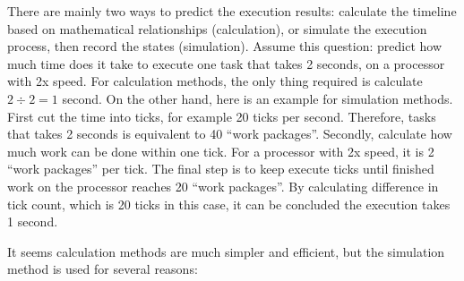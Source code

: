 \documentclass[msc,deptreport, cs]{infthesis}
\begin{document}
There are mainly two ways to predict the execution results: calculate the timeline based on mathematical relationships (calculation), or simulate the execution process, then record the states (simulation). Assume this question: predict how much time does it take to execute one task that takes 2 seconds, on a processor with 2x speed. For calculation methods, the only thing required is calculate $2\div 2 = 1$ second. On the other hand, here is an example for simulation methods. First cut the time into ticks, for example 20 ticks per second. Therefore, tasks that takes 2 seconds is equivalent to 40 ``work packages''. Secondly, calculate how much work can be done within one tick. For a processor with 2x speed, it is 2 ``work packages'' per tick. The final step is to keep execute ticks until finished work on the processor reaches 20 ``work packages''. By calculating difference in tick count, which is 20 ticks in this case, it can be concluded the execution takes 1 second.

It seems calculation methods are much simpler and efficient, but the simulation method is used for several reasons:
\end{document}
